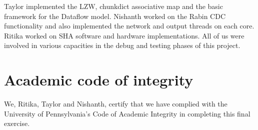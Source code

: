 \documentclass{article}
\begin{document}
\par
Taylor implemented the LZW, chunkdict associative map and the basic framework for the Dataflow model. 
\newline\newline
Nishanth worked on the Rabin CDC functionality and also implemented the network and output threads on each core.
\newline\newline
Ritika worked on SHA software and hardware implementations.
\newline\newline
All of us were involved in various capacities in the debug and testing phases of this project.  
 
\section{Academic code of integrity}
We, Ritika, Taylor and Nishanth, certify that we have complied with the University of Pennsylvania’s Code of Academic Integrity in completing this final exercise.
\end{document}
